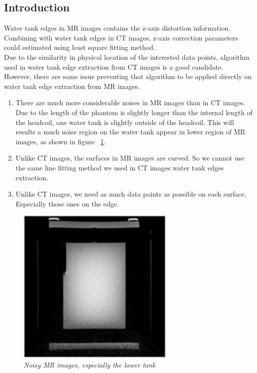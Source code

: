 
\subsection{Introduction}

Water tank edges in MR images contains the z-axis distortion information. Combining with water tank edges in 
CT images, z-axis correction parameters could estimated using least square fitting method. \\
Due to the similarity in physical location of the interested data points, algorithm used in water tank edge
extraction from CT images is a good candidate. However, there are some issue preventing that algorithm to be
applied directly on water tank edge extraction from MR images.

\begin{enumerate}
\item There are much more considerable noises in MR images than in CT images. Due to the length of the phantom 
  is slightly longer than the internal length of the headcoil, one water tank is slightly outside of the
  headcoil. This will results a much noise region on the water tank appear in lower region of MR images, as
  shown in figure ~\ref{fig:mri_noise_sample}.
\item Unlike CT images, the surfaces in MR images are curved. So we cannot use the same line fitting method
  we used in CT images water tank edges extraction.
\item Unlike CT images, we need as much data points as possible on each surface. Especially those ones on the
  edge. 
\end{enumerate}

\begin{figure}[htb]
  \hfill
  \begin{minipage}[b]{3in}
    \centering
    \centerline{\mbox{\includegraphics[width=3in]{data_extraction/images/MRI/sample_mri_phantom.eps}}}
  \end{minipage}
  \hfill
  \caption{\emph{Noisy MR images, especially the lower tank}}
  \label{fig:mri_noise_sample}
\end{figure}

